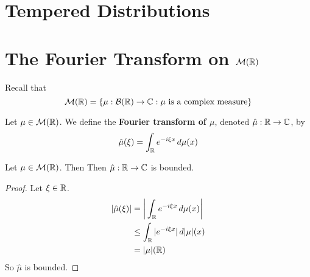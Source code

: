 \documentclass{book}
\begin{document}
	
	
	
	
	
	
	
	
	
	
	
	
	
	
	
	
	
	
	
	
	
	
	
	
	
	\newpage
	\section{Tempered Distributions}
	
	
	
	
	
	
	
	
	
	
	
	
	
	
	
	
	
	
	
	\newpage
	\section{The Fourier Transform on $\mathcal{M}(\mathbb{R})$}
	
	\begin{note}
		Recall that $$\mathcal{M}(\mathbb{R}) = \{\mu: \mathcal{B}(\mathbb{R}) \rightarrow \mathbb{C}: \mu \text{ is a complex measure}\}$$
	\end{note}
	
	\begin{defn}
		Let $\mu \in \mathcal{M}(\mathbb{R})$. We define the \textbf{Fourier transform of $\mu$}, denoted $\hat{\mu}: \mathbb{R} \rightarrow \mathbb{C}$, by
		$$\hat{\mu}(\xi) = \int_{\mathbb{R}} e^{-i \xi x} \, d \mu(x)$$ 
	\end{defn}
	
	\begin{ex}
		Let $\mu \in \mathcal{M}(\mathbb{R})$. Then Then $\hat{\mu} : \mathbb{R} \rightarrow \mathbb{C}$ is bounded.
	\end{ex}
	
	\begin{proof}
		Let $\xi \in \mathbb{R}$. 
		\begin{align*}
			|\hat{\mu}(\xi)|
			& = \bigg | \int_{\mathbb{R}} e^{-i \xi x} \, d \mu(x) \bigg| \\
			& \leq \int_{\mathbb{R}} |e^{-i \xi x}| \, d|\mu|(x) \\
			& = |\mu|(\mathbb{R}) \\
		\end{align*}
		So $\hat{\mu}$ is bounded.
	\end{proof}
	
\end{document}
